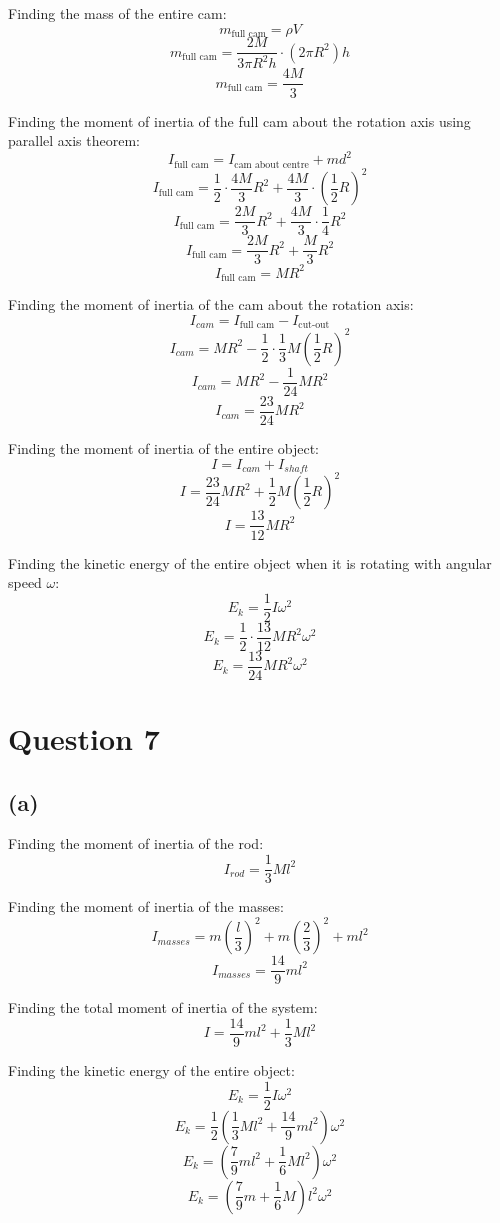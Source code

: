 \documentclass[11pt]{article}
\begin{document}
Finding the mass of the entire cam:
\[m_{\text{full cam}} = \rho V\]
\[m_{\text{full cam}} = \frac{2M}{3 \pi R^2h} \cdot (2 \pi R^2) h\]
\[m_{\text{full cam}} = \frac{4M}{3}\]

\newpage

Finding the moment of inertia of the full cam about the rotation axis using parallel axis theorem:
\[I_{\text{full cam}} = I_{\text{cam about centre}} + md^2\]
\[I_{\text{full cam}} = \frac{1}{2} \cdot \frac{4M}{3} R^2 + \frac{4M}{3} \cdot \left(\frac{1}{2}R \right)^2\]
\[I_{\text{full cam}} = \frac{2M}{3} R^2 + \frac{4M}{3} \cdot \frac{1}{4}R^2\]
\[I_{\text{full cam}} = \frac{2M}{3} R^2 + \frac{M}{3}R^2\]
\[I_{\text{full cam}} = MR^2\]

Finding the moment of inertia of the cam about the rotation axis:
\[I_{cam} = I_{\text{full cam}} - I_{\text{cut-out}}\]
\[I_{cam} = MR^2 - \frac{1}{2} \cdot \frac{1}{3} M \left( \frac{1}{2} R \right)^2\]
\[I_{cam} = MR^2 - \frac{1}{24} MR^2\]
\[I_{cam} = \frac{23}{24} MR^2\]

Finding the moment of inertia of the entire object:
\[I = I_{cam} + I_{shaft}\]
\[I = \frac{23}{24}MR^2 + \frac{1}{2}M \left( \frac{1}{2} R \right)^2\]
\[I = \frac{13}{12}MR^2\]

Finding the kinetic energy of the entire object when it is rotating with angular speed \(\omega\):
\[E_k = \frac{1}{2}I \omega^2\]
\[E_k = \frac{1}{2} \cdot \frac{13}{12}MR^2 \omega^2\]
\[E_k = \frac{13}{24}MR^2 \omega^2\]


\section{Question 7}
\label{sec:org8528a5f}

\subsection{(a)}
\label{sec:orgcde9193}
Finding the moment of inertia of the rod:
\[I_{rod} = \frac{1}{3} M l^2\]

Finding the moment of inertia of the masses:
\[I_{masses} = m \left(\frac{l}{3} \right)^2 + m \left(\frac{2}{3} \right)^2 + m l^2\]
\[I_{masses} = \frac{14}{9} m l^2\]

Finding the total moment of inertia of the system:
\[I = \frac{14}{9} m l^2 + \frac{1}{3} M l^2\]

Finding the kinetic energy of the entire object:
\[E_k = \frac{1}{2} I \omega^2\]
\[E_k = \frac{1}{2} \left(\frac{1}{3}Ml^2 + \frac{14}{9}ml^2 \right) \omega^2\]
\[E_k = \left( \frac{7}{9}ml^2 + \frac{1}{6}Ml^2 \right) \omega^2\]
\[E_k = \left( \frac{7}{9}m + \frac{1}{6}M \right) l^2 \omega^2\]
\end{document}

